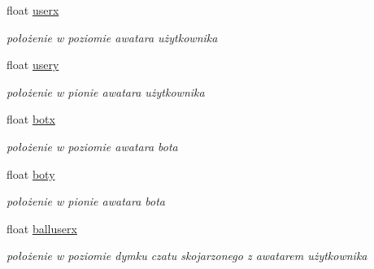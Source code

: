 \begin{DoxyCompactItemize}
\item 
\mbox{\label{struct_avatar_initializer_ab0701fc9963370884ddd1878812497ce}} 
float \mbox{\hyperlink{struct_avatar_initializer_ab0701fc9963370884ddd1878812497ce}{userx}}
\begin{DoxyCompactList}\small\item\em położenie w poziomie awatara użytkownika \end{DoxyCompactList}\item 
\mbox{\label{struct_avatar_initializer_a1352e5a506da0f5993fb3db7d65c66f1}} 
float \mbox{\hyperlink{struct_avatar_initializer_a1352e5a506da0f5993fb3db7d65c66f1}{usery}}
\begin{DoxyCompactList}\small\item\em położenie w pionie awatara użytkownika \end{DoxyCompactList}\item 
\mbox{\label{struct_avatar_initializer_a99f06ba65aedf124e3865c34d0140e11}} 
float \mbox{\hyperlink{struct_avatar_initializer_a99f06ba65aedf124e3865c34d0140e11}{botx}}
\begin{DoxyCompactList}\small\item\em położenie w poziomie awatara bota \end{DoxyCompactList}\item 
\mbox{\label{struct_avatar_initializer_abb30595b197530d0d7823b1df0e89c78}} 
float \mbox{\hyperlink{struct_avatar_initializer_abb30595b197530d0d7823b1df0e89c78}{boty}}
\begin{DoxyCompactList}\small\item\em położenie w pionie awatara bota \end{DoxyCompactList}\item 
\mbox{\label{struct_avatar_initializer_a2721e209921dfd79b80bde879db72b39}} 
float \mbox{\hyperlink{struct_avatar_initializer_a2721e209921dfd79b80bde879db72b39}{balluserx}}
\begin{DoxyCompactList}\small\item\em położenie w poziomie dymku czatu skojarzonego z awatarem użytkownika \end{DoxyCompactList}\item 

\end{DoxyCompactItemize}

